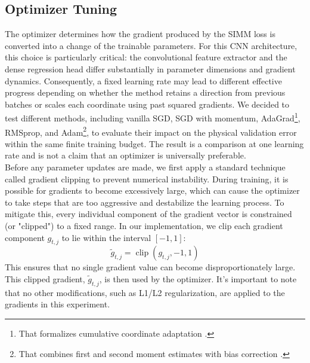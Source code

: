 \subsection{Optimizer Tuning}
\label{sec:04_optimizer_tuning}

The optimizer determines how the gradient produced by the SIMM loss is converted into a change of the trainable parameters. For this CNN architecture, this choice is particularly critical: the convolutional feature extractor and the dense regression head differ substantially in parameter dimensions and gradient dynamics. Consequently, a fixed learning rate may lead to different effective progress depending on whether the method retains a direction from previous batches or scales each coordinate using past squared gradients. We decided to test different methods, including vanilla SGD, SGD with momentum, AdaGrad\footnote{That formalizes cumulative coordinate adaptation \cite{duchi2011adaptive}.}, RMSprop, and Adam\footnote{That combines first and second moment estimates with bias correction \cite{kingma2015adam}.}, to evaluate their impact on the physical validation error within the same finite training budget. The result is a comparison at one learning rate and is not a claim that an optimizer is universally preferable.\\

Before any parameter updates are made, we first apply a standard technique called gradient clipping to prevent numerical instability. During training, it is possible for gradients to become excessively large, which can cause the optimizer to take steps that are too aggressive and destabilize the learning process. To mitigate this, every individual component of the gradient vector is constrained (or "clipped") to a fixed range. In our implementation, we clip each gradient component $g_{t,j}$ to lie within the interval $[-1,1]$:
\begin{equation}
    \tilde{g}_{t,j}=\operatorname{clip}(g_{t,j},-1,1)
    \label{eq:04_optimizer_clipping}
\end{equation}
This ensures that no single gradient value can become disproportionately large. This clipped gradient, $\tilde{g}_{t,j}$, is then used by the optimizer. It's important to note that no other modifications, such as L1/L2 regularization, are applied to the gradients in this experiment.\\

